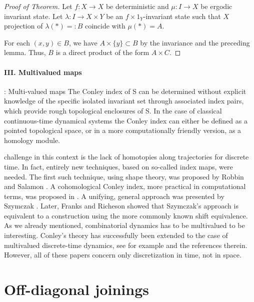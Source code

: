 \documentclass[12pt,oneside,pb-diagram]{article}
\begin{document}
\begin{proof}[Proof of Theorem]
	Let $f: X \to X$ be deterministic and $\mu: I \to X$ be ergodic invariant state. Let $\lambda: I \to X \times Y$ be an $f \times 1_Y$-invariant  state such that $X$ projection of $\lambda(*) =: B$ coincide with $\mu(*) = A$.
	
	For each $(x,y) \in B$, we have $A \times \{y\} \subset B$ by the invariance and the preceding lemma. Thus, $B$ is a direct product of the form $A\times C$.
\end{proof}

\paragraph{III. Multivalued maps}  : Multi-valued maps \cite{BarmakEtAl2026conley} 
The Conley index \cite{Conley1978} of S can be determined without explicit knowledge of the specific isolated invariant set through associated index pairs, which provide rough topological enclosures of S. In the case of classical continuous-time dynamical systems the Conley index can either be defined as a pointed topological space, or in a more computationally friendly version, as a homology module.

challenge in this context is the lack of homotopies along trajectories for discrete time. In fact, entirely new techniques, based on so-called index maps, were needed. The first such technique, using shape theory, was proposed by Robbin and Salamon \cite{RobbinSalamon1988}. A cohomological Conley index, more practical in computational terms, was proposed in \cite{mrozek1990leray}. A unifying, general approach was presented by Szymczak \cite{Szymczak1995conley}. Later, Franks and Richeson \cite{FranksRicheson2000shift} showed that Szymczak’s approach is equivalent to a construction using the more commonly known shift equivalence. As we already mentioned, combinatorial dynamics has to be multivalued to be interesting. Conley’s theory has successfully been extended to the case of multivalued discrete-time dynamics, see for example \cite{KaczynskiMrozek1995conley, BatkoMrozek2016weak, BatkoMrozek2017weak, batko2023morse, Stolot2006homotopy} and the references therein. However, all of these papers concern only discretization in time, not in space.
\section{Off-diagonal joinings}  \label{sec:off_diag_join}
\end{document}
